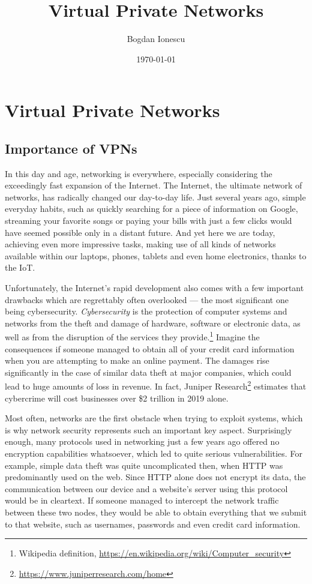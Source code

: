 \documentclass[a4paper,12pt]{report}
\begin{document}
	\title{Virtual Private Networks}
	\author{Bogdan Ionescu}
	\date{\today}
	\maketitle
	\tableofcontents
	
	\chapter{Virtual Private Networks}
	\section{Importance of VPNs}
		In this day and age, networking is everywhere, especially considering the exceedingly fast expansion of the Internet. The Internet, the ultimate network of networks, has radically changed our day-to-day life. Just several years ago, simple everyday habits, such as quickly searching for a piece of information on Google, streaming your favorite songs or paying your bills with just a few clicks would have seemed possible only in a distant future. And yet here we are today, achieving even more impressive tasks, making use of all kinds of networks available within our laptops, phones, tablets and even home electronics, thanks to the IoT.
		
		Unfortunately, the Internet's rapid development also comes with a few important drawbacks which are regrettably often overlooked --- the most significant one being cybersecurity. \textit{Cybersecurity} is the protection of computer systems and networks from the theft and damage of hardware, software or electronic data, as well as from the disruption of the services they provide.\footnote{Wikipedia definition, \url{https://en.wikipedia.org/wiki/Computer_security}} Imagine the consequences if someone managed to obtain all of your credit card information when you are attempting to make an online payment. The damages rise significantly in the case of similar data theft at major companies, which could lead to huge amounts of loss in revenue. In fact, Juniper Research\footnote{\url{https://www.juniperresearch.com/home}} estimates that cybercrime will cost businesses over \$2 trillion in 2019 alone.
		
		Most often, networks are the first obstacle when trying to exploit systems, which is why network security represents such an important key aspect. Surprisingly enough, many protocols used in networking just a few years ago offered no encryption capabilities whatsoever, which led to quite serious vulnerabilities. For example, simple data theft was quite uncomplicated then, when HTTP was predominantly used on the web. Since HTTP alone does not encrypt its data, the communication between our device and a website's server using this protocol would be in cleartext. If someone managed to intercept the network traffic between these two nodes, they would be able to obtain everything that we submit to that website, such as usernames, passwords and even credit card information.
		
\end{document}

